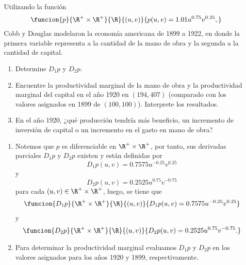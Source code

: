 \documentclass[a4,11pt]{aleph-examen}
\begin{document}
\begin{preguntas}
\begin{respuesta}
\begin{respuesta}

\item 
    Utilizando la función
    \[
        \funcion{p}{\R^{+}\times\R^{+}}{\R}{(u,v)}{p(u,v)=1.01u^{0.75}v^{0.25},}
    \]
    Cobb y Douglas modelaron la economía americana de 1899 a 1922, en donde la primera variable representa a la cantidad de la mano de obra y la segunda a la cantidad de capital.
    \begin{enumerate}
        \item Determine $D_1 p$ y $D_2 p$.
        \item Encuentre la productividad marginal de la mano de obra y la productividad marginal del capital en el año 1920 en $(194, 407)$ (comparado con los valores asignados en 1899 de $(100,100)$). Interprete los resultados.
        \item En el año 1920, ¿qué producción tendría más beneficio, un incremento de inversión de capital o un incremento en el gasto en mano de obra?
    \end{enumerate}

\begin{respuesta}
    \begin{enumerate}
        \item 
        Notemos que $p$ es diferenciable en $\R^{+} \times \R^{+}$, por tanto, sus derivadas parciales $D_1 p$ y $D_2 p$ existen y están definidas por
        \[
            D_1 p(u,v) = 0.7575 u^{-0.25} v^{0.25}
        \]
        y
        \[
            D_2 p(u,v) = 0.2525 u^{0.75} v^{-0.75}
        \]
        para cada $(u,v)\in \R^{+} \times \R^{+}$, luego, se tiene que 
        \[
            \funcion{D_1 p}{\R^{+}\times\R^{+}}{\R}{(u,v)}{D_1 p(u,v) = 0.7575 u^{-0.25} v^{0.25}}
        \]
        y
        \[
            \funcion{D_2 p}{\R^{+}\times\R^{+}}{\R}{(u,v)}{D_2 p(u,v) = 0.2525 u^{0.75} v^{-0.75}.}
        \]
        \item
        Para determinar la productividad marginal evaluamos $D_1 p$ y $D_2 p$ en los valores asignados para los años 1920 y 1899, respectivamente.
        

\end{enumerate}
\end{respuesta}
\end{respuesta}
\end{respuesta}
\end{preguntas}
\end{document}
